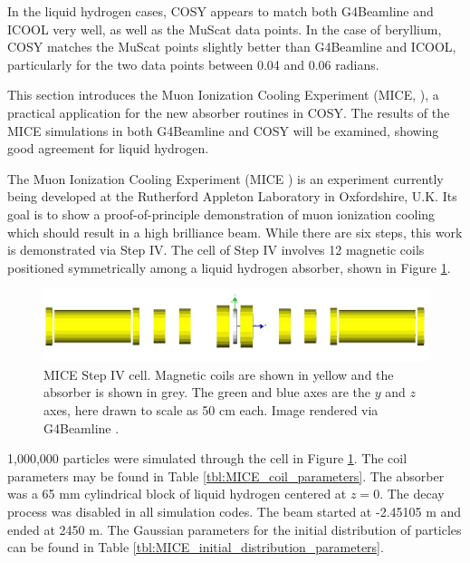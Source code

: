 In the liquid hydrogen cases, COSY appears to match both G4Beamline and ICOOL very well, as well as the MuScat data points. In the case of beryllium, COSY matches the MuScat points slightly better than G4Beamline and ICOOL, particularly for the two data points between 0.04 and 0.06 radians.

\label{sec:mice}

This section introduces the Muon Ionization Cooling Experiment (MICE, \cite{mice}), a practical application for the new absorber routines in COSY. The results of the MICE simulations in both G4Beamline and COSY will be examined, showing good agreement for liquid hydrogen.

\label{ssc:miceIntro}

The Muon Ionization Cooling Experiment (MICE \cite{mice}) is an experiment currently being developed at the Rutherford Appleton Laboratory in Oxfordshire, U.K. Its goal is to show a proof-of-principle demonstration of muon ionization cooling which should result in a high brilliance beam. While there are six steps, this work is demonstrated via Step IV. The cell of Step IV involves 12 magnetic coils positioned symmetrically among a liquid hydrogen absorber, shown in Figure \ref{fig:miceStepIV}.
\begin{figure}[h!]
  \centering
    \includegraphics[width=\textwidth]{Figures/miceStepIV} 
  \caption[MICE Step IV cell.]{MICE Step IV cell. Magnetic coils are shown in yellow and the absorber is shown in grey. The green and blue axes are the $y$ and $z$ axes, here drawn to scale as 50 cm each. Image rendered via G4Beamline \cite{g4bl}.}
  \label{fig:miceStepIV}
\end{figure}

\label{ssc:miceResults}
1,000,000 particles were simulated through the cell in Figure \ref{fig:miceStepIV}. The coil parameters may be found in Table \ref{tbl:MICE_coil_parameters}. The absorber was a 65 mm cylindrical block of liquid hydrogen centered at $z=0$. The decay process was disabled in all simulation codes. The beam started at -2.45105 m and ended at 2450 m. The Gaussian parameters for the initial distribution of particles can be found in Table \ref{tbl:MICE_initial_distribution_parameters}.

